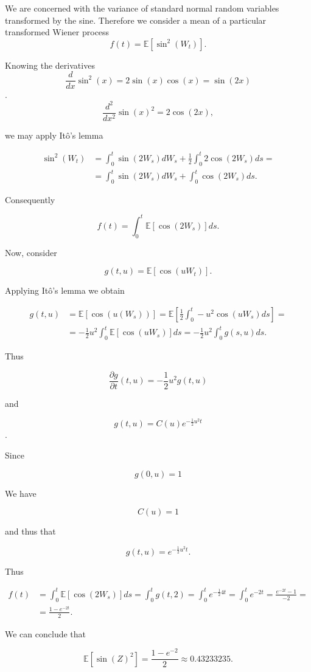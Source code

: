 \documentclass{letter}
\begin{document}
We are concerned with the variance of standard normal random variables transformed by the sine. Therefore we consider a mean of a particular transformed Wiener process $$f(t)=\mathbb{E}\left[\sin^2(W_t)\right].$$

Knowing the derivatives  $$\frac{d}{dx}\sin^2(x)=2\sin(x)\cos(x)=\sin(2x)$$. $$\frac{d^2}{dx^2}\sin(x)^2 = 2\cos(2x),$$

we may apply Itô's lemma

\begin{equation*}
\begin{split}
\sin^2(W_t) &= \int_0^t \sin(2W_s)dW_s + \frac{1}{2}\int_0^t 2\cos(2W_s)ds =\\
&=\int_0^t \sin(2W_s)dW_s + \int_0^t \cos(2W_s)ds.
\end{split}
\end{equation*}

Consequently

$$f(t)=\int_0^t\mathbb{E}\left[\cos(2W_s)\right]ds.$$

Now, consider

$$g(t,u)=\mathbb{E}\left[\cos(uW_t)\right].$$

Applying Itô's lemma we obtain

\begin{equation*}
\begin{split}
g(t,u)&=\mathbb{E}\left[\cos(u(W_s))\right]=\mathbb{E}\left[\frac{1}{2}\int_0^t-u^2\cos(uW_s)ds\right]=\\
&=-\frac{1}{2}u^2\int_0^t\mathbb{E}\left[\cos(uW_s)\right]ds=-\frac{1}{2}u^2 \int_0^tg(s,u)ds.
\end{split}
\end{equation*}

Thus

$$\frac{\partial g}{\partial t}\left(t,u\right)=-\frac{1}{2}u^2 g\left(t,u\right)$$
\newpage

and

$$g(t,u)=C(u)e^{-\frac{1}{2}u^2t}$$.

Since

$$g(0,u)=1$$

We have

$$C(u)=1$$

and thus that

$$g(t,u)=e^{-\frac{1}{2}u^2t}.$$

Thus

\begin{equation*}
\begin{split}
f(t)&=\int_0^t\mathbb{E}\left[\cos(2W_s)\right]ds=\int_0^tg(t,2)=\int_0^te^{-\frac{1}{2}4t}=\int_0^te^{-2t}=\frac{e^{-2t}-1}{-2}=\\
&=\frac{1-e^{-2t}}{2}.
\end{split}
\end{equation*}

We can conclude that

$$\mathbb{E}\left[\sin(Z)^2\right]=\frac{1-e^{-2}}{2}\approx 0.43233235.$$
\end{document}
